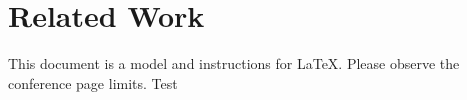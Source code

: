 \section{Related Work}
This document is a model and instructions for \LaTeX.
Please observe the conference page limits.
Test
